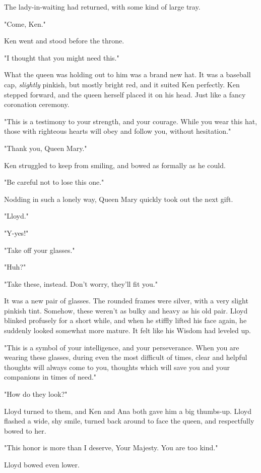\documentclass[
]{article}
\begin{document}
The lady-in-waiting had returned, with some kind of large tray.

"Come, Ken."

Ken went and stood before the throne.

"I thought that you might need this."

What the queen was holding out to him was a brand new hat. It was a
baseball cap, \emph{slightly} pinkish, but mostly bright red, and it
suited Ken perfectly. Ken stepped forward, and the queen herself placed
it on his head. Just like a fancy coronation ceremony.

"This is a testimony to your strength, and your courage. While you wear
this hat, those with righteous hearts will obey and follow you, without
hesitation."

"Thank you, Queen Mary."

Ken struggled to keep from smiling, and bowed as formally as he could.

"Be careful not to lose this one."

Nodding in such a lonely way, Queen Mary quickly took out the next gift.

"Lloyd."

"Y-yes!"

"Take off your glasses."

"Huh?"

"Take these, instead. Don't worry, they'll fit you."

It was a new pair of glasses. The rounded frames were silver, with a
very slight pinkish tint. Somehow, these weren't as bulky and heavy as
his old pair. Lloyd blinked profusely for a short while, and when he
stiffly lifted his face again, he suddenly looked somewhat more mature.
It felt like his Wisdom had leveled up.

"This is a symbol of your intelligence, and your perseverance. When you
are wearing these glasses, during even the most difficult of times,
clear and helpful thoughts will always come to you, thoughts which will
save you and your companions in times of need."

"How do they look?"

Lloyd turned to them, and Ken and Ana both gave him a big thumbs-up.
Lloyd flashed a wide, shy smile, turned back around to face the queen,
and respectfully bowed to her.

"This honor is more than I deserve, Your Majesty. You are too kind."

Lloyd bowed even lower.
\end{document}
